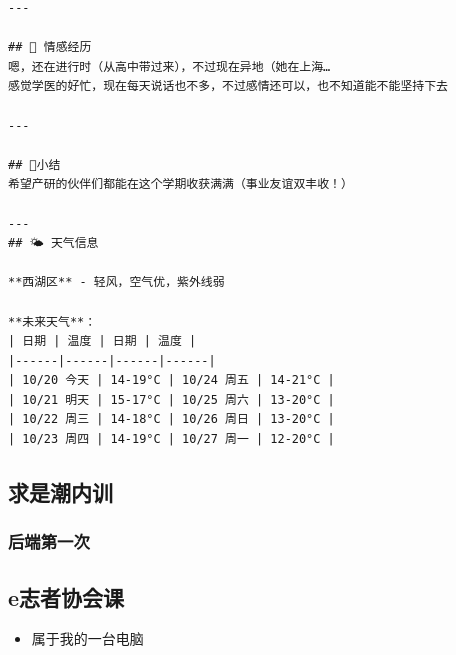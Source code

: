 \documentclass{book}
\begin{document}
\begin{lstlisting}[style=markdownstyle]
---

## 💑 情感经历
嗯，还在进行时（从高中带过来），不过现在异地（她在上海…
感觉学医的好忙，现在每天说话也不多，不过感情还可以，也不知道能不能坚持下去

---

## 🎯小结
希望产研的伙伴们都能在这个学期收获满满（事业友谊双丰收！）

---
## 🌤️ 天气信息

**西湖区** - 轻风，空气优，紫外线弱

**未来天气**：
| 日期 | 温度 | 日期 | 温度 |
|------|------|------|------|
| 10/20 今天 | 14-19°C | 10/24 周五 | 14-21°C |
| 10/21 明天 | 15-17°C | 10/25 周六 | 13-20°C |
| 10/22 周三 | 14-18°C | 10/26 周日 | 13-20°C |
| 10/23 周四 | 14-19°C | 10/27 周一 | 12-20°C |

    \end{lstlisting}
\subsection{求是潮内训}
\subsubsection{后端第一次}
\subsection{e志者协会课}
    \begin{itemize}
        \item 属于我的一台电脑
    \end{itemize}
    
\end{document}
